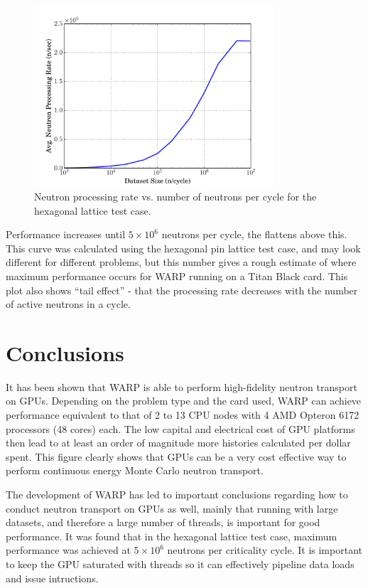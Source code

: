 \documentclass[preprint,12pt]{elsarticle}
\begin{document}
\begin{figure}[h!]
\centering
\includegraphics[width=0.8\textwidth,trim= 1cm 0cm 1cm 0cm]{graphics/scaling.pdf}
\caption{Neutron processing rate vs. number of neutrons per cycle for the hexagonal lattice test case. \label{scaling} }
\end{figure}

Performance increases until $5\times10^6$ neutrons per cycle, the flattens above this.  This curve was calculated using the hexagonal pin lattice test case, and may look different for different problems, but this number gives a rough estimate of where maximum performance occurs for WARP running on a Titan Black card.  This plot also shows ``tail effect'' - that the processing rate decreases with the number of active neutrons in a cycle.  

\newpage
\section{Conclusions}
\label{sec:conc}

It has been shown that WARP is able to perform high-fidelity neutron transport on GPUs.  Depending on the problem type and the card used, WARP can achieve performance equivalent to that of 2 to 13 CPU nodes with 4 AMD Opteron 6172 processors (48 cores) each.  The low capital and electrical cost of GPU platforms then lead to at least an order of magnitude more histories calculated per dollar spent.  This figure clearly shows that GPUs can be a very cost effective way to perform continuous energy Monte Carlo neutron transport.

The development of WARP has led to important conclusions regarding how to conduct neutron transport on GPUs as well, mainly that running with large datasets, and therefore a large number of threads, is important for good performance.  It was found that in the hexagonal lattice test case, maximum performance was achieved at $5\times10^6$ neutrons per criticality cycle.  It is important to keep the GPU saturated with threads so it can effectively pipeline data loads and issue intructions.  
\end{document}
